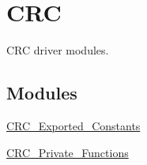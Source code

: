 \hypertarget{group___c_r_c}{\section{C\-R\-C}
\label{group___c_r_c}
}


C\-R\-C driver modules.  


\subsection*{Modules}
\begin{DoxyCompactItemize}
\item 
\hyperlink{group___c_r_c___exported___constants}{C\-R\-C\-\_\-\-Exported\-\_\-\-Constants}
\item 
\hyperlink{group___c_r_c___private___functions}{C\-R\-C\-\_\-\-Private\-\_\-\-Functions}
\end{DoxyCompactItemize}
